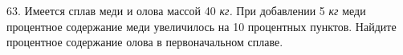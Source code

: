 63. Имеется сплав меди и олова массой 40 {\it кг.} При добавлении 5 {\it кг} меди процентное содержание меди увеличилось на 10 процентных пунктов. Найдите процентное содержание олова в первоначальном сплаве.\\
